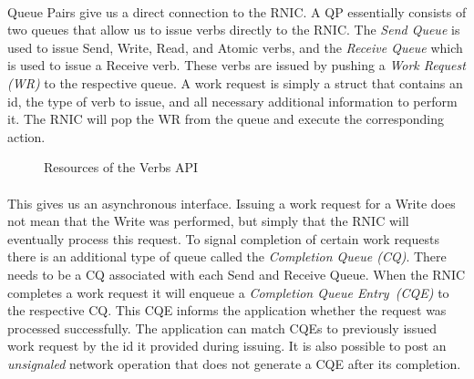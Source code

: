 \paragraph{} Queue Pairs give us a direct connection to the RNIC. A QP essentially consists of two queues that allow us to 
issue verbs directly to the RNIC. The \emph{Send Queue} is used to issue Send, Write, Read, and Atomic verbs, and the 
\emph{Receive Queue} which is used to issue a Receive verb. These verbs are issued by pushing a \emph{Work Request (WR)}
to the respective queue. A work request is simply a struct that contains an id, the type of verb to issue, and all necessary 
additional information to perform it. The RNIC will pop the WR from the queue and execute the corresponding action.

\begin{figure}[!ht]
\begin{center}
\end{center}
\caption{Resources of the Verbs API}
\label{fig:rdma-parts}
\end{figure}


\paragraph{} This gives us an asynchronous interface. Issuing a work request for a Write does not mean that the Write was
performed, but simply that the RNIC will eventually process this request. To signal completion of certain work requests there
is an additional type of queue called the \emph{Completion Queue (CQ)}. There needs to be a CQ associated with each Send and 
Receive Queue. When the RNIC completes a work request it will enqueue a \emph{Completion Queue Entry~(CQE)} to the respective
CQ. This CQE informs the application whether the request was processed successfully. The application can match CQEs to 
previously issued work request by the id it provided during issuing. It is also possible to post an \emph{unsignaled} network
operation that does not generate a CQE after its completion.


